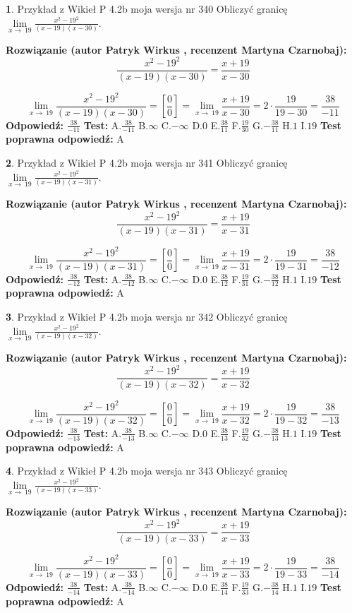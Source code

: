 \documentclass[12pt, a4paper]{article}
\theoremstyle{definition} %
\newtheorem{zad}{}
\newcommand{\zadStart}[1]{\begin{zad}#1\newline}
\newcommand{\zadStop}{\end{zad}}
\newcommand{\rozwStart}[2]{\noindent \textbf{Rozwiązanie (autor #1 , recenzent #2): }\newline}
\newcommand{\rozwStop}{\newline}
\newcommand{\odpStart}{\noindent \textbf{Odpowiedź:}\newline}
\newcommand{\odpStop}{\newline}
\newcommand{\testStart}{\noindent \textbf{Test:}\newline}
\newcommand{\testStop}{\newline}
\newcommand{\kluczStart}{\noindent \textbf{Test poprawna odpowiedź:}\newline}
\newcommand{\kluczStop}{\newline}
\begin{document}
\zadStart{Przykład z Wikieł P 4.2b moja wersja nr 340}
Obliczyć granicę $\lim\limits_{x\to\ 19}\frac{x^{2}-19^{2}}{(x-19)(x-30)}$.
\zadStop
\rozwStart{Patryk Wirkus}{Martyna Czarnobaj}
$$\frac{x^{2}-19^{2}}{(x-19)(x-30)}=\frac{x+19}{x-30}$$

$$\lim\limits_{x\to\ 19}\frac{x^{2}-19^{2}}{(x-19)(x-30)}=[\frac{0}{0}]=\lim\limits_{x\to\ 19}\frac{x+19}{x-30}=2 \cdot \frac{19}{19-30} = \frac{38}{-11}$$
\rozwStop
\odpStart
$\frac{38}{-11}$
\odpStop
\testStart
A.$\frac{38}{-11}$
B.$\infty$
C.$-\infty$
D.$0$
E.$\frac{38}{11}$
F.$\frac{19}{30}$
G.$-\frac{38}{11}$
H.$1$
I.$19$
\testStop
\kluczStart
A
\kluczStop



\zadStart{Przykład z Wikieł P 4.2b moja wersja nr 341}
Obliczyć granicę $\lim\limits_{x\to\ 19}\frac{x^{2}-19^{2}}{(x-19)(x-31)}$.
\zadStop
\rozwStart{Patryk Wirkus}{Martyna Czarnobaj}
$$\frac{x^{2}-19^{2}}{(x-19)(x-31)}=\frac{x+19}{x-31}$$

$$\lim\limits_{x\to\ 19}\frac{x^{2}-19^{2}}{(x-19)(x-31)}=[\frac{0}{0}]=\lim\limits_{x\to\ 19}\frac{x+19}{x-31}=2 \cdot \frac{19}{19-31} = \frac{38}{-12}$$
\rozwStop
\odpStart
$\frac{38}{-12}$
\odpStop
\testStart
A.$\frac{38}{-12}$
B.$\infty$
C.$-\infty$
D.$0$
E.$\frac{38}{12}$
F.$\frac{19}{31}$
G.$-\frac{38}{12}$
H.$1$
I.$19$
\testStop
\kluczStart
A
\kluczStop



\zadStart{Przykład z Wikieł P 4.2b moja wersja nr 342}
Obliczyć granicę $\lim\limits_{x\to\ 19}\frac{x^{2}-19^{2}}{(x-19)(x-32)}$.
\zadStop
\rozwStart{Patryk Wirkus}{Martyna Czarnobaj}
$$\frac{x^{2}-19^{2}}{(x-19)(x-32)}=\frac{x+19}{x-32}$$

$$\lim\limits_{x\to\ 19}\frac{x^{2}-19^{2}}{(x-19)(x-32)}=[\frac{0}{0}]=\lim\limits_{x\to\ 19}\frac{x+19}{x-32}=2 \cdot \frac{19}{19-32} = \frac{38}{-13}$$
\rozwStop
\odpStart
$\frac{38}{-13}$
\odpStop
\testStart
A.$\frac{38}{-13}$
B.$\infty$
C.$-\infty$
D.$0$
E.$\frac{38}{13}$
F.$\frac{19}{32}$
G.$-\frac{38}{13}$
H.$1$
I.$19$
\testStop
\kluczStart
A
\kluczStop



\zadStart{Przykład z Wikieł P 4.2b moja wersja nr 343}
Obliczyć granicę $\lim\limits_{x\to\ 19}\frac{x^{2}-19^{2}}{(x-19)(x-33)}$.
\zadStop
\rozwStart{Patryk Wirkus}{Martyna Czarnobaj}
$$\frac{x^{2}-19^{2}}{(x-19)(x-33)}=\frac{x+19}{x-33}$$

$$\lim\limits_{x\to\ 19}\frac{x^{2}-19^{2}}{(x-19)(x-33)}=[\frac{0}{0}]=\lim\limits_{x\to\ 19}\frac{x+19}{x-33}=2 \cdot \frac{19}{19-33} = \frac{38}{-14}$$
\rozwStop
\odpStart
$\frac{38}{-14}$
\odpStop
\testStart
A.$\frac{38}{-14}$
B.$\infty$
C.$-\infty$
D.$0$
E.$\frac{38}{14}$
F.$\frac{19}{33}$
G.$-\frac{38}{14}$
H.$1$
I.$19$
\testStop
\kluczStart
A
\kluczStop
\end{document}
